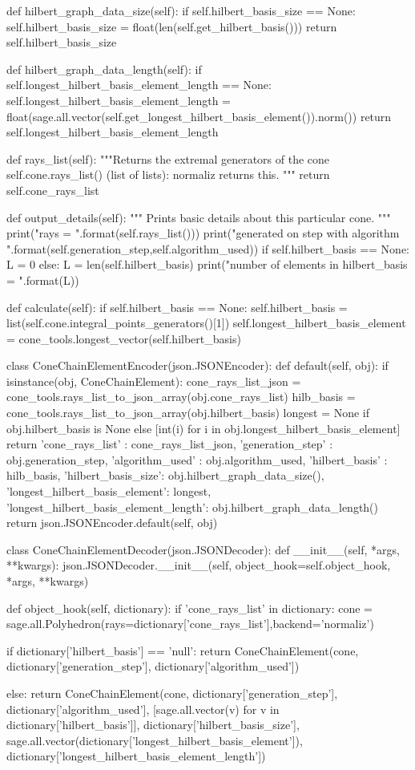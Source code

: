 \documentclass{TC}
\begin{document}
\begin{SAGE}
	def hilbert_graph_data_size(self):
		if self.hilbert_basis_size == None:
			self.hilbert_basis_size = float(len(self.get_hilbert_basis()))
		return self.hilbert_basis_size

	def hilbert_graph_data_length(self):
		if self.longest_hilbert_basis_element_length == None:
			self.longest_hilbert_basis_element_length = float(sage.all.vector(self.get_longest_hilbert_basis_element()).norm())
		return self.longest_hilbert_basis_element_length

	def rays_list(self):
		"""Returns the extremal generators of the cone 
		self.cone.rays_list() (list of lists): normaliz returns this.
		"""
		return self.cone_rays_list

	def output_details(self):
		""" Prints basic details about this particular cone. """
		print("rays = {}".format(self.rays_list()))
		print("generated on step {} with algorithm {}".format(self.generation_step,self.algorithm_used))
		if self.hilbert_basis == None:
			L = 0
		else:
			L = len(self.hilbert_basis)
		print("number of elements in hilbert_basis = {}".format(L))

	def calculate(self):
		if self.hilbert_basis == None:
			self.hilbert_basis = list(self.cone.integral_points_generators()[1])
		self.longest_hilbert_basis_element = cone_tools.longest_vector(self.hilbert_basis)
		

class ConeChainElementEncoder(json.JSONEncoder):
	def default(self, obj):
		if isinstance(obj, ConeChainElement):
			cone_rays_list_json = cone_tools.rays_list_to_json_array(obj.cone_rays_list)
			hilb_basis = cone_tools.rays_list_to_json_array(obj.hilbert_basis)
			longest = None if obj.hilbert_basis is None else [int(i) for i in obj.longest_hilbert_basis_element]
			return {'cone_rays_list' : cone_rays_list_json, 
				'generation_step' : obj.generation_step, 
				'algorithm_used' : obj.algorithm_used, 
				'hilbert_basis' : hilb_basis,
				'hilbert_basis_size': obj.hilbert_graph_data_size(),
				'longest_hilbert_basis_element': longest,
				'longest_hilbert_basis_element_length': obj.hilbert_graph_data_length()}
		return json.JSONEncoder.default(self, obj)

class ConeChainElementDecoder(json.JSONDecoder):
	def __init__(self, *args, **kwargs):
		json.JSONDecoder.__init__(self, object_hook=self.object_hook, *args, **kwargs)
	
	def object_hook(self, dictionary):
		if 'cone_rays_list' in dictionary:
			cone = sage.all.Polyhedron(rays=dictionary['cone_rays_list'],backend='normaliz')
		
		if dictionary['hilbert_basis'] == 'null':
			return ConeChainElement(cone,
				dictionary['generation_step'], 
				dictionary['algorithm_used'])
		
		else:
			return ConeChainElement(cone,
				dictionary['generation_step'], 
				dictionary['algorithm_used'],
				[sage.all.vector(v) for v in dictionary['hilbert_basis']],
				dictionary['hilbert_basis_size'],
				sage.all.vector(dictionary['longest_hilbert_basis_element']),
				dictionary['longest_hilbert_basis_element_length'])
\end{SAGE}
\end{document}
